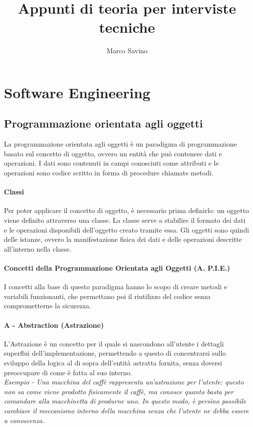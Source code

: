 \documentclass{article}
\title{Appunti di teoria per interviste tecniche}
\author{Marco Savino}
\date{}
\begin{document}
\maketitle

\section{Software Engineering}
    \subsection{Programmazione orientata agli oggetti}
        La programmazione orientata agli oggetti è un paradigma di programmazione basato sul concetto di oggetto, ovvero un entità che può contenere dati e operazioni. I dati sono contenuti in campi conosciuti come attributi e le operazioni sono codice scritto in forma di procedure chiamate metodi.
        \paragraph{Classi} Per poter applicare il concetto di oggetto, è necessario prima definirlo: un oggetto viene definito attraverso una classe. La classe serve a stabilire il formato dei dati e le operazioni disponibili dell'oggetto creato tramite essa. Gli oggetti sono quindi delle istanze, ovvero la manifestazione fisica dei dati e delle operazioni descritte all'interno nella classe.
        
        \paragraph{Concetti della Programmazione Orientata agli Oggetti (A. P.I.E.)}
        I concetti alla base di questo paradigma hanno lo scopo di creare metodi e variabili funzionanti, che permettano poi il riutilizzo del codice senza comprometterne la sicurezza.
        
        \paragraph{A - Abstraction (Astrazione)} L'Astrazione è un concetto per il quale si nascondono all'utente i dettagli superflui dell'implementazione, permettendo a questo di concentrarsi sullo sviluppo della logica al di sopra dell'entità astratta fornita, senza doversi preoccupare di come è fatta al suo interno.\\
            \textit{Esempio - Una macchina del caffè rappresenta un'astrazione per l'utente: questo non sa come viene prodotto fisicamente il caffè, ma conosce quanto basta per comandare alla macchinetta di produrne uno. In questo modo, è persino possibile cambiare il meccanismo interno della macchina senza che l'utente ne debba essere a conoscenza.}
        
\end{document}
